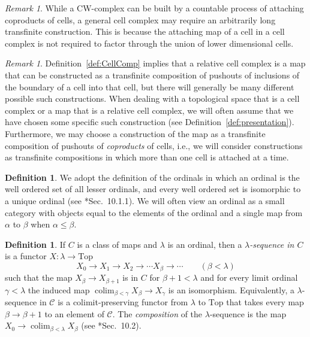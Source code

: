 \documentclass{amsart}
\numberwithin{equation}{section}
\theoremstyle{slplain}
\theoremstyle{definition}
\newtheorem{defn}[equation]{Definition} %
\theoremstyle{remark}
\newtheorem{rem}[equation]{Remark}      %
\newcommand{\defref}{Definition~\ref}
\newcommand{\cat}[1]{\mathcal{#1}}
\DeclareMathOperator*{\colim}{colim}
\begin{document}
\begin{rem}
  \label{rem:CWcell}
  While a CW-complex can be built by a countable process of attaching
  coproducts of cells, a general cell complex may require an
  arbitrarily long transfinite construction.  This is because the
  attaching map of a cell in a cell complex is not required to factor
  through the union of lower dimensional cells.
\end{rem}


\begin{rem}
  \label{rem:CelCompPres}
  \defref{def:CellComp} implies that a relative cell complex is a map
  that can be constructed as a transfinite composition of pushouts of
  inclusions of the boundary of a cell into that cell, but there will
  generally be many different possible such constructions.  When
  dealing with a topological space that is a cell complex or a map
  that is a relative cell complex, we will often assume that we have
  chosen some specific such construction (see
  \defref{def:presentation}).  Furthermore, we may choose a
  construction of the map as a transfinite composition of pushouts of
  \emph{coproducts} of cells, i.e., we will consider constructions as
  transfinite compositions in which more than one cell is attached at
  a time.
\end{rem}


\begin{defn}
  \label{def:ordinal}
  We adopt the definition of the ordinals in which an ordinal is the
  well ordered set of all lesser ordinals, and every well ordered set
  is isomorphic to a unique ordinal (see \cite{MCATL}*{Sec.~10.1.1}).
  We will often view an ordinal as a small category with objects equal
  to the elements of the ordinal and a single map from $\alpha$ to
  $\beta$ when $\alpha \le \beta$.
\end{defn}

\begin{defn}
  \label{def:lambdaseq}
  If $C$ is a class of maps and $\lambda$ is an ordinal, then a
  \emph{$\lambda$-sequence in $C$} is a functor $X\colon \lambda \to
  \mathrm{Top}$
  \begin{displaymath}
    X_{0} \to X_{1} \to X_{2} \to \cdots X_{\beta} \to \cdots
    \qquad (\beta < \lambda)
  \end{displaymath}
  such that the map $X_{\beta} \to X_{\beta+1}$ is in $C$ for $\beta+1
  < \lambda$ and for every limit ordinal $\gamma < \lambda$ the
  induced map $\colim_{\beta<\gamma} X_{\beta} \to X_{\gamma}$ is an
  isomorphism.  Equivalently, a $\lambda$-sequence in $\cat C$ is a
  colimit-preserving functor from $\lambda$ to $\mathrm{Top}$ that
  takes every map $\beta \to \beta+1$ to an element of $\cat C$.  The
  \emph{composition} of the $\lambda$-sequence is the map $X_{0} \to
  \colim_{\beta<\lambda}X_{\beta}$ (see \cite{MCATL}*{Sec.~10.2}).
\end{defn}
\end{document}
